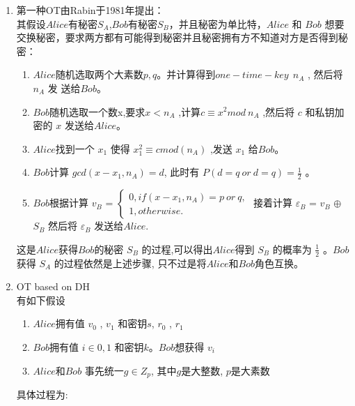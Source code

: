 \begin{enumerate}
    
 \item  第一种OT由Rabin于1981年\cite{rabin1981exchange}提出：\\
其假设$Alice$有秘密$S_A$,$Bob$有秘密$S_B$，并且秘密为单比特，$Alice$ 和 $Bob$ 想要交换秘密，要求两方都有可能得到秘密并且秘密拥有方不知道对方是否得到秘密：
    \begin{enumerate}
    \item  $Alice$随机选取两个大素数$p,q$。并计算得到$one-time-  key ~~ n_ {A} $ , 然后将 $ n_ {A} $ 发
送给$Bob$。
   \item  $Bob$随机选取一个数x,要求$x <  n_ {A} $ ,计算$ c \equiv  x^ {2}  mod ~n_ {A} $ ,然后将 $c$ 和私钥加密的 $x$ 发送给$Alice$。
   \item  $Alice$找到一个 $ x_ {1} $ 使得 $ x_ {1}^ {2}  \equiv cmod(  n_ {A} )$ ,发送 $ x_ {1} $ 给$Bob$。
   \item  $Bob$计算 $ gcd(x-  x_ {1}  ,  n_ {A}  )=d $, 此时有 $P(d = q\ or\ d = q)=  \frac {1}{2} $ 。
   \item  $Bob$根据计算  $ v_ {B} $ = $ \begin{cases}0,if(x-x_{1},n_{A})=p~or~q,\\1,otherwise.\end{cases} $ 
    接着计算 $ \varepsilon _ {B} $ = $ v_ {B} $ $ \oplus $ $ S_ {B} $ 然后将 $ \varepsilon _ {B} $ 发送给$Alice$.
    \end{enumerate}
    \noindent 这是$Alice$获得$Bob$的秘密 $ S_ {B} $ 的过程,可以得出$Alice$得到 $ S_ {B} $ 的概率为 $ \frac {1}{2} $ 。$Bob$获得 $ S_ {A} $ 的过程依然是上述步骤, 只不过是将$Alice$和$Bob$角色互换。\\
 \item  OT based on DH\cite{naor2001efficient}  \\
   有如下假设
   \begin{enumerate}
    \item  $Alice$拥有值 $ v_ {0} $ , $ v_ {1} $ 和密钥$s$, $ r_ {0} $ , $ r_ {1} $ 
    \item  $Bob$拥有值 $i \in {0,1} $ 和密钥$k$。$Bob$想获得 $ v_ {i} $ 
    \item  $Alice $和$Bob$ 事先统一$g  \in  Z_p$, 其中$g$是大整数, $p$是大素数
   \end{enumerate} 
    \noindent 具体过程为:


\end{enumerate}
